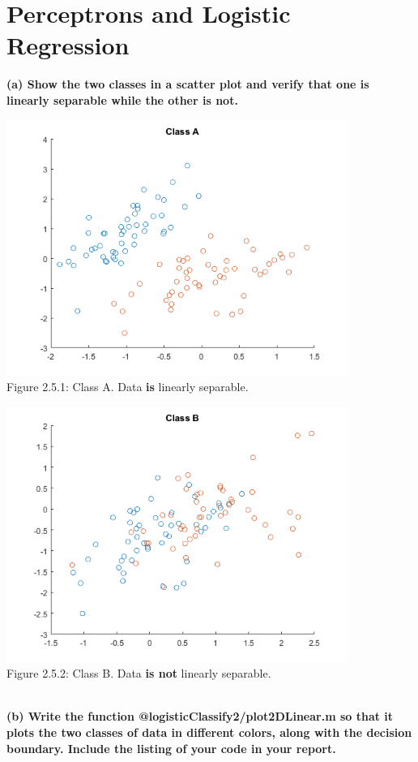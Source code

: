 \documentclass[]{report}   %
\begin{document}
\section{Perceptrons and Logistic Regression}
{\bf (a) Show the two classes in a scatter plot and verify that one is linearly separable while the other is not.}
\begin{center}
	\includegraphics[width=30em,keepaspectratio]{2_5_Figure_1.png}\\
	{Figure 2.5.1: Class A. Data {\bf is} linearly separable.}
\end{center} 
\begin{center}
	\includegraphics[width=30em,keepaspectratio]{2_5_Figure_2.png}\\
	{Figure 2.5.2: Class B. Data {\bf is not} linearly separable.}
\end{center} 
~\\
{\bf (b) Write the function @logisticClassify2/plot2DLinear.m so that it plots the two
classes of data in different colors, along with the decision boundary. Include the listing of your code in your report.}
\end{document}
